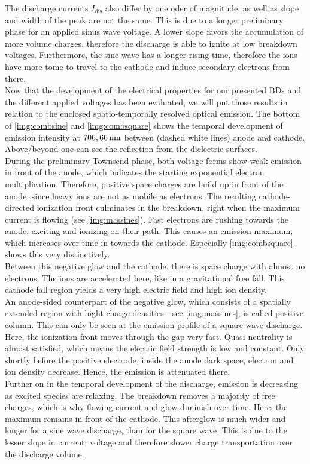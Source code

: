 \documentclass[a4paper,10pt,twoside]{article}
\newcommand{\ix}[1]{_\text{#1}}
\begin{document}
	\twocolumn

		The discharge currents $I\ix{dis}$ also differ by one oder of magnitude, as well as slope and width of the peak are not the same. This is due to a longer preliminary phase for an applied sinus wave voltage. A lower slope favors the accumulation of more volume charges, therefore the discharge is able to ignite at low breakdown voltages. Furthermore, the sine wave has a longer rising time, therefore the ions have more tome to travel to the cathode and induce secondary electrons from there.\\					
		Now that the development of the electrical properties for our presented BDs and the different applied voltages has been evaluated, we will put those results in relation to the enclosed spatio-temporally resolved optical emission. The bottom of \autoref{img:combsine} and \autoref{img:combsquare} shows the temporal development of emission intensity at $\unit[706,66]{nm}$ between (dashed white lines) anode and cathode. Above/beyond one can see the reflection from the dielectric surfaces.\\
		During the preliminary Townsend phase, both voltage forms show weak emission in front of the anode, which indicates the starting exponential electron multiplication. Therefore, positive space charges are build up in front of the anode, since heavy ions are not as mobile as electrons. The resulting cathode-directed ionization front culminates in the breakdown, right when the maximum current is flowing (see \autoref{img:massines}). Fast electrons are rushing towards the anode, exciting and ionizing on their path. This causes an emission maximum, which increases over time in towards the cathode. Especially \autoref{img:combsquare} shows this very distinctively.\\
		Between this negative glow and the cathode, there is space charge with almost no electrons. The ions are accelerated here, like in a gravitational free fall. This cathode fall region yields a very high electric field and high ion density.\\
		An anode-sided counterpart of the negative glow, which consists of a spatially extended region with hight charge densities - see \autoref{img:massines}, is called positive column. This can only be seen at the emission profile of a square wave discharge. Here, the ionization front moves through the gap very fast. Quasi neutrality is almost satisfied, which means the electric field strength is low and constant. Only shortly before the positive electrode, inside the anode dark space, electron and ion density decrease. Hence, the emission is attenuated there.\\
		Further on in the temporal development of the discharge, emission is decreasing as excited species are relaxing. The breakdown removes a majority of free charges, which is why flowing current and glow diminish over time. Here, the maximum remains in front of the cathode. This afterglow is much wider and longer for a sine wave discharge, than for the square wave. This is due to the lesser slope in current, voltage and therefore slower charge transportation over the discharge volume.
		
\end{document}
